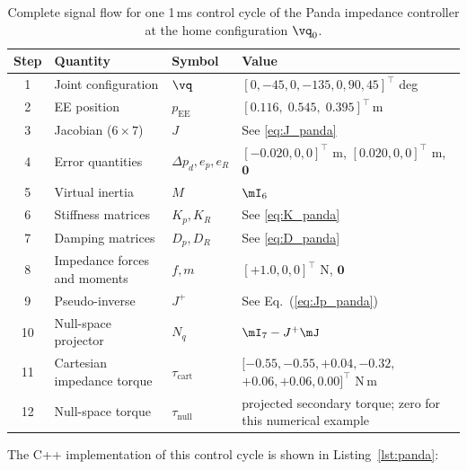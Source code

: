 \begin{table}[htb]
\centering
\caption{Complete signal flow for one 1\,ms control cycle of the
         Panda impedance controller at the home configuration $\vq_0$.}
\label{tab:panda_loop}
\renewcommand{\arraystretch}{1.45}
\begin{tabular}{@{}c>{\raggedright\arraybackslash}p{3.6cm}>{\raggedright\arraybackslash}p{2.7cm}>{\raggedright\arraybackslash}p{5.9cm}@{}}
\toprule
Step & Quantity & Symbol & Value \\
\midrule
1  & Joint configuration   & $\vq$          & $[0, -45, 0, -135, 0, 90, 45]^\top$ deg \\
2  & EE position           & $p_{\mathrm{EE}}$ & $[0.116,\;0.545,\;0.395]^\top\,\mathrm{m}$ \\
3  & Jacobian ($6\times7$) & $J$   & See \cref{eq:J_panda} \\
4  & Error quantities & $\Delta p_d,e_p,e_R$ & $[-0.020,0,0]^\top$ m, $[0.020,0,0]^\top$ m, $\mathbf{0}$ \\
5  & Virtual inertia       & $M$   & $\mI_6$ \\
6  & Stiffness matrices    & $K_p, K_R$ & See \cref{eq:K_panda} \\
7  & Damping matrices      & $D_p, D_R$ & See \cref{eq:D_panda} \\
8  & Impedance forces and moments & $f,m$ & $[+1.0,0,0]^\top$ N, $\mathbf{0}$ \\
9  & Pseudo-inverse        & $J^+$ & See Eq.~(\ref{eq:Jp_panda}) \\
10 & Null-space projector  & $N_q$   & $\mI_7 - J^+\mJ$ \\
11 & Cartesian impedance torque & $\tau_{\mathrm{cart}}$ & $[-0.55, -0.55, +0.04, -0.32,$\newline$+0.06, +0.06, 0.00]^\top$ N\,m \\
12 & Null-space torque    & $\tau_{\mathrm{null}}$ & projected secondary torque; zero for this numerical example \\
\bottomrule
\end{tabular}
\end{table}

The C++ implementation of this control cycle is shown in Listing~\ref{lst:panda}:

